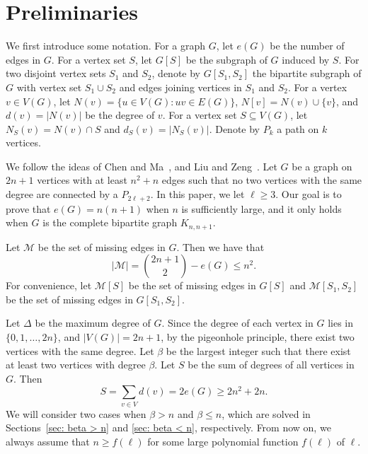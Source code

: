 \documentclass[12pt]{article}%
\begin{document}
\section{Preliminaries}\label{sec: preliminaries}

We first introduce some notation.
For a graph $G$, let $e(G)$ be the number of edges in $G$.
For a vertex set $S$, let $G[S]$ be the subgraph of $G$ induced by $S$.
For two disjoint vertex sets $S_1$ and $S_2$, denote by $G[S_1, S_2]$ the bipartite subgraph of $G$ with vertex set $S_1 \cup S_2$ and edges joining vertices in $S_1$ and $S_2$.
For a vertex $v\in V(G)$, let $N(v)=\{u\in V(G):uv\in E(G)\}$, $N[v]=N(v)\cup\{v\}$, and $d(v)=|N(v)|$ be the degree of $v$.
For  a vertex set $S\subseteq V(G)$, let $N_S(v)=N(v)\cap S$ and $d_S(v)=|N_S(v)|$.
Denote by $P_k$ a path on $k$ vertices.

We follow the ideas of Chen and Ma~\cite{CHEN20261}, and Liu and Zeng~\cite{2025arXiv250500523L}.
Let $G$ be a graph on $2n+1$ vertices with at least $n^2+n$ edges such that no two vertices with the same degree are connected by a $P_{2\ell+2}$.
In this paper, we let $\ell \ge 3$.
Our goal is to prove that $e(G) = n(n+1)$ when $n$ is sufficiently large, and it only holds when $G$ is the complete bipartite graph $K_{n,n+1}$.

Let $\mathcal{M}$ be the set of missing edges in $G$.
Then we have that
\begin{equation}\label{eq: missing edges}
	|\mathcal{M}| = \binom{2n+1}{2} - e(G)\le n^2.
\end{equation}
For convenience, let $\mathcal{M}[S]$ be the set of missing edges in $G[S]$ and $\mathcal{M}[S_1, S_2]$ be the set of missing edges in $G[S_1, S_2]$.

Let $\Delta$ be the maximum degree of  $G$.
Since the degree of each vertex in $G$ lies in $\{0,1,\dots,2n\}$, and  $|V(G)|=2n+1$, by the pigeonhole principle, there exist two vertices with the same degree.
Let $\beta$ be the largest integer such that there exist at least two vertices with degree $\beta$.
Let $S$ be the sum of degrees of all vertices in $G$. Then
\begin{equation}\label{eq: sum of degrees lower bound}
	S = \sum_{v \in V} d(v) = 2e(G)\geq 2n^2+2n.
\end{equation}
We will consider two cases when $\beta > n$ and $\beta \le n$, which are solved in Sections~\ref{sec: beta > n} and \ref{sec: beta < n}, respectively.
From now on, we always assume that $n \ge f(\ell)$ for some large polynomial function $f(\ell)$ of $\ell$.
\end{document}
